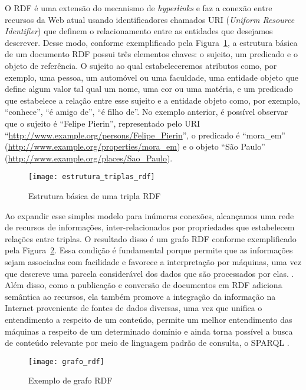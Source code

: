 O RDF é uma extensão do mecanismo de \emph{hyperlinks} e faz a conexão entre recursos da Web atual usando identificadores chamados URI (\emph{Uniform Resource Identifier}) que definem o relacionamento entre as entidades que desejamos descrever. Desse modo, conforme exemplificado pela Figura~\ref{fig:estrutura_triplas_rdf}, a estrutura básica de um documento RDF possui três elementos chaves: o sujeito, um predicado e o objeto de referência. O sujeito ao qual estabeleceremos atributos como, por exemplo, uma pessoa, um automóvel ou uma faculdade, uma entidade objeto que define algum valor tal qual um nome, uma cor ou uma matéria, e um predicado que estabelece a relação entre esse sujeito e a entidade objeto como, por exemplo, ``conhece'', ``é amigo de'', ``é filho de''. No exemplo anterior, é possível observar que o sujeito é ``Felipe Pierin'', representado pelo URI ``\url{http://www.example.org/persons/Felipe_Pierin}'', o predicado é ``mora\_em'' (\url{http://www.example.org/properties/mora_em}) e o objeto ``São Paulo'' (\url{http://www.example.org/places/Sao_Paulo}).

\begin{figure}[!ht]
  \centering
  \texttt{[image: estrutura\_triplas\_rdf]} 
  \caption{Estrutura básica de uma tripla RDF}
  \label{fig:estrutura_triplas_rdf} 
\end{figure}

Ao expandir esse simples modelo para inúmeras conexões, alcançamos uma rede de recursos de informações, inter-relacionados por propriedades que estabelecem relações entre triplas. O resultado disso é um grafo RDF conforme exemplificado pela Figura~\ref{fig:grafo_rdf}. Essa condição é fundamental porque permite que as informações sejam associadas com facilidade e favorece a interpretação por máquinas, uma vez que descreve uma parcela considerável dos dados que são processados por elas. \citep{Allemang2011}. Além disso, como a publicação e conversão de documentos em RDF adiciona semântica ao recursos, ela também promove a integração da informação na Internet proveniente de fontes de dados diversas, uma vez que unifica o entendimento a respeito de um conteúdo, permite um melhor entendimento das máquinas a respeito de um determinado domínio e ainda torna possível a busca de conteúdo relevante por meio de linguagem padrão de consulta, o SPARQL \citep{Heath2008}.

\begin{figure}[!ht]
  \centering
  \texttt{[image: grafo\_rdf]} 
  \caption{Exemplo de grafo RDF}
  \label{fig:grafo_rdf} 
\end{figure}


